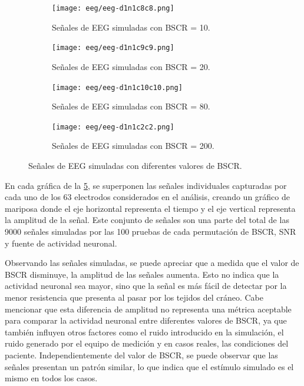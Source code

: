 \begin{figure}[p]
    \centering
    \begin{subfigure}{\textwidth}
        \texttt{[image: eeg/eeg-d1n1c8c8.png]}
        \caption{Señales de EEG simuladas con BSCR = 10.}
        \label{fig:eeg-d1n1c8c8}
        \vspace{0.5em}
    \end{subfigure}
    \vfill
    \begin{subfigure}{\textwidth}
        \texttt{[image: eeg/eeg-d1n1c9c9.png]}
        \caption{Señales de EEG simuladas con BSCR = 20.}
        \label{fig:eeg-d1n1c9c9}
        \vspace{0.5em}
    \end{subfigure}
    \vfill
    \begin{subfigure}{\textwidth}
        \texttt{[image: eeg/eeg-d1n1c10c10.png]}
        \caption{Señales de EEG simuladas con BSCR = 80.}
        \label{fig:eeg-d1n1c10c10}
        \vspace{0.5em}
    \end{subfigure}
    \vfill
    \begin{subfigure}{\textwidth}
        \texttt{[image: eeg/eeg-d1n1c2c2.png]}
        \caption{Señales de EEG simuladas con BSCR = 200.}
        \label{fig:eeg-d1n1c2c2}
    \end{subfigure}
    \caption{Señales de EEG simuladas con diferentes valores de BSCR.}
    \label{fig:eeg-simulated}
\end{figure}

En cada gráfica de la \cref{fig:eeg-simulated}, se superponen las señales individuales capturadas por cada uno de los 63 electrodos considerados en el análisis, creando un gráfico de mariposa donde el eje horizontal representa el tiempo y el eje vertical representa la amplitud de la señal.
Este conjunto de señales son una parte del total de las 9000 señales simuladas por las 100 pruebas de cada permutación de BSCR, SNR y fuente de actividad neuronal.

Observando las señales simuladas, se puede apreciar que a medida que el valor de BSCR disminuye, la amplitud de las señales aumenta.
Esto no indica que la actividad neuronal sea mayor, sino que la señal es más fácil de detectar por la menor resistencia que presenta al pasar por los tejidos del cráneo.
Cabe mencionar que esta diferencia de amplitud no representa una métrica aceptable para comparar la actividad neuronal entre diferentes valores de BSCR, ya que también influyen otros factores como el ruido introducido en la simulación, el ruido generado por el equipo de medición y en casos reales, las condiciones del paciente.
Independientemente del valor de BSCR, se puede observar que las señales presentan un patrón similar, lo que indica que el estímulo simulado es el mismo en todos los casos.

